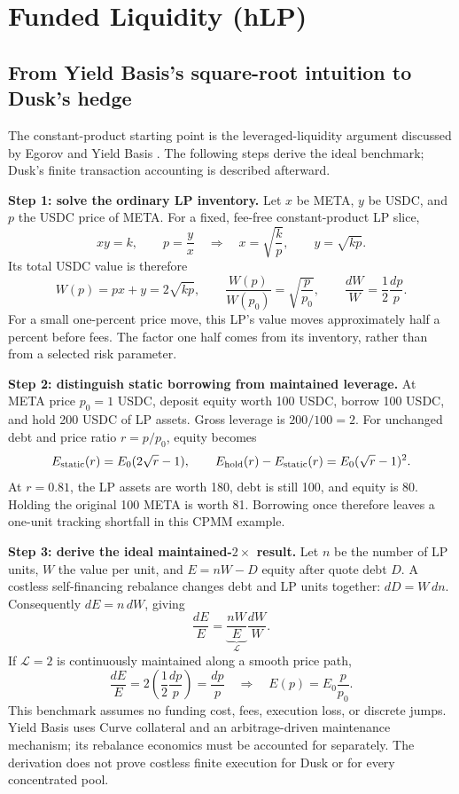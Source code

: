 \section{Funded Liquidity (hLP)}
\label{sec:hlp}

\subsection{From Yield Basis's square-root intuition to Dusk's hedge}
\label{sec:hlp-derivation}

The constant-product starting point is the leveraged-liquidity argument discussed by Egorov and Yield Basis \cite{egorov-yieldbasis-whitepaper,yieldbasis-compounding}. The following steps derive the ideal benchmark; Dusk's finite transaction accounting is described afterward.

\textbf{Step 1: solve the ordinary LP inventory.} Let $x$ be META, $y$ be USDC, and $p$ the USDC price of META. For a fixed, fee-free constant-product LP slice,
\[
xy=k,\qquad p=\frac yx
\quad\Longrightarrow\quad
x=\sqrt{\frac{k}{p}},\qquad y=\sqrt{kp}.
\]
Its total USDC value is therefore
\begin{equation}
W(p)=px+y=2\sqrt{kp},\qquad
\frac{W(p)}{W(p_0)}=\sqrt{\frac{p}{p_0}},\qquad
\frac{dW}{W}=\frac12\frac{dp}{p}.
\label{eq:lp-payoff}
\end{equation}
For a small one-percent price move, this LP's value moves approximately half a percent before fees. The factor one half comes from its inventory, rather than from a selected risk parameter.

\textbf{Step 2: distinguish static borrowing from maintained leverage.} At META price $p_0=1$ USDC, deposit equity worth 100 USDC, borrow 100 USDC, and hold 200 USDC of LP assets. Gross leverage is $200/100=2$. For unchanged debt and price ratio $r=p/p_0$, equity becomes
\begin{equation}
E_{\rm static}(r)=E_0(2\sqrt r-1),\qquad
E_{\rm hold}(r)-E_{\rm static}(r)=E_0(\sqrt r-1)^2.
\label{eq:static-tracking}
\end{equation}
At $r=0.81$, the LP assets are worth 180, debt is still 100, and equity is 80. Holding the original 100 META is worth 81. Borrowing once therefore leaves a one-unit tracking shortfall in this CPMM example.

\textbf{Step 3: derive the ideal maintained-$2\times$ result.} Let $n$ be the number of LP units, $W$ the value per unit, and $E=nW-D$ equity after quote debt $D$. A costless self-financing rebalance changes debt and LP units together: $dD=W\,dn$. Consequently $dE=n\,dW$, giving
\[
\frac{dE}{E}=\underbrace{\frac{nW}{E}}_{\mathcal L}\frac{dW}{W}.
\]
If $\mathcal L=2$ is continuously maintained along a smooth price path,
\[
\frac{dE}{E}=2\left(\frac12\frac{dp}{p}\right)=\frac{dp}{p}
\quad\Longrightarrow\quad E(p)=E_0\frac{p}{p_0}.
\]
This benchmark assumes no funding cost, fees, execution loss, or discrete jumps. Yield Basis uses Curve collateral and an arbitrage-driven maintenance mechanism; its rebalance economics must be accounted for separately. The derivation does not prove costless finite execution for Dusk or for every concentrated pool.

